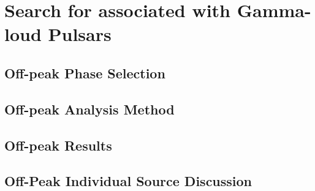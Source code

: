 
\chapter{Search for  associated with Gamma-loud Pulsars}


\section{Off-peak Phase Selection}
\section{Off-peak Analysis Method}
\section{Off-peak Results}
\section{Off-Peak Individual Source Discussion}
